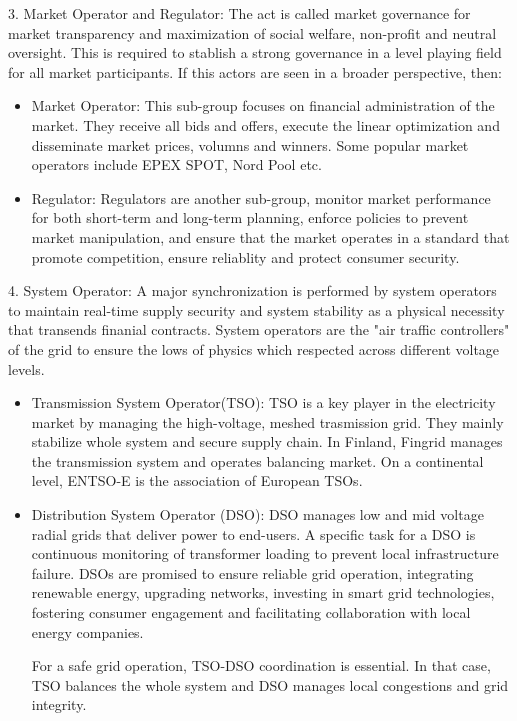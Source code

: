 3. Market Operator and Regulator: The act is called market governance for market transparency and maximization of social welfare, non-profit and neutral oversight. This is required to stablish a strong governance in a level playing field for all market participants. If this actors are seen in a broader perspective, then:
\begin{itemize}
    \item Market Operator: This sub-group focuses on financial administration of the market. They receive all bids and offers, execute the linear optimization and disseminate market prices, volumns and winners. Some popular market operators include EPEX SPOT, Nord Pool etc.
    \item Regulator: Regulators are another sub-group, monitor market performance for both short-term and long-term planning, enforce policies to prevent market manipulation, and ensure that the market operates in a standard that promote competition, ensure reliablity and protect consumer security.
\end{itemize}

4. System Operator: A major synchronization is performed by system operators to maintain real-time supply security and system stability as a physical necessity that transends finanial contracts. System operators are the "air traffic controllers" of the grid to ensure the lows of physics which respected across different voltage levels.
    \begin{itemize}
    \item Transmission System Operator(TSO): TSO is a key player in the electricity market by managing the high-voltage, meshed trasmission grid. They mainly stabilize whole system and secure supply chain. In Finland, Fingrid manages the transmission system and operates balancing market. On a continental level, ENTSO-E is the association of European TSOs.
    \item Distribution System Operator (DSO): DSO manages low and mid voltage radial grids that deliver power to end-users. A specific task for a DSO is continuous monitoring of transformer loading to prevent local infrastructure failure. DSOs are promised to ensure reliable grid operation, integrating renewable energy, upgrading networks, investing in smart grid technologies, fostering consumer engagement and facilitating collaboration with local energy companies. 
    
    For a safe grid operation, TSO-DSO coordination is essential. In that case, TSO balances the whole system and DSO manages local congestions and grid integrity. 
\end{itemize}

